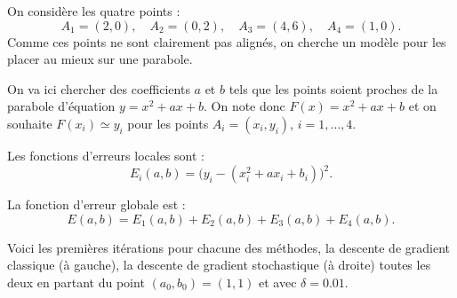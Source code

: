\documentclass[11pt,class=report,crop=false]{standalone}
\begin{document}
\begin{exemple}
On considère les quatre points :
$$A_1=(2,0), \quad A_2=(0,2), \quad A_3=(4, 6), \quad A_4=(1,0).$$ 
Comme ces points ne sont clairement pas alignés, on cherche un modèle pour les placer au mieux sur une parabole.


On va ici chercher des coefficients $a$ et $b$ tels que les points soient proches de la parabole d'équation $y=x^2+ax+b$.
On note donc $F(x) = x^2+ax+b$ et on souhaite $F(x_i) \simeq y_i$ pour les points $A_i = (x_i,y_i)$, $i=1,\ldots,4$.

Les fonctions d'erreurs locales sont :
$$E_i(a,b) = \big(y_i - (x_i^2+ax_i+b_i)\big)^2.$$

La fonction d'erreur globale est :
$$E(a,b) = E_1(a,b)+E_2(a,b)+E_3(a,b)+E_4(a,b).$$

%

Voici les premières itérations pour chacune des méthodes, la descente de gradient classique (à gauche), la descente de gradient stochastique (à droite) toutes les deux en partant du point $(a_0,b_0)=(1,1)$ et avec $\delta = 0.01$.


\end{exemple}
\end{document}
